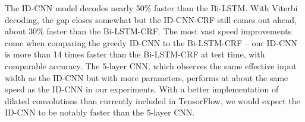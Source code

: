 The ID-CNN model decodes nearly 50\% faster than the Bi-LSTM. With Viterbi decoding, the gap closes somewhat but the ID-CNN-CRF still comes out ahead, about 30\% faster than the Bi-LSTM-CRF. The most vast speed improvements come when comparing the greedy ID-CNN to the Bi-LSTM-CRF -- our ID-CNN is more than 14 times faster than the Bi-LSTM-CRF at test time, with comparable accuracy. The 5-layer CNN, which observes the same effective input width as the ID-CNN but with more parameters, performs at about the same speed as the ID-CNN in our experiments. With a better implementation of dilated convolutions than currently included in TensorFlow, we would expect the ID-CNN to be notably faster than the 5-layer CNN.




